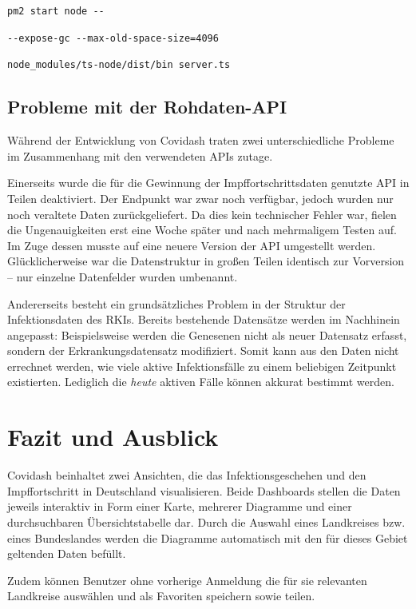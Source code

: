 \documentclass[conference]{IEEEtran}
\begin{document}
\texttt{pm2 start node -{}-}

\texttt{-{}-expose-gc -{}-max-old-space-size=4096}

\texttt{node\_modules/ts-node/dist/bin server.ts}



\subsection{Probleme mit der Rohdaten-API}

Während der Entwicklung von Covidash traten zwei unterschiedliche Probleme im Zusammenhang mit den verwendeten APIs zutage.

Einerseits wurde die für die Gewinnung der Impffortschrittsdaten genutzte API in Teilen deaktiviert. Der Endpunkt war zwar noch verfügbar, jedoch wurden nur noch veraltete Daten zurückgeliefert. Da dies kein technischer Fehler war, fielen die Ungenauigkeiten erst eine Woche später und nach mehrmaligem Testen auf. Im Zuge dessen musste auf eine neuere Version der API umgestellt werden. Glücklicherweise war die Datenstruktur in großen Teilen identisch zur Vorversion -- nur einzelne Datenfelder wurden umbenannt.

Andererseits besteht ein grundsätzliches Problem in der Struktur der Infektionsdaten des RKIs. Bereits bestehende Datensätze werden im Nachhinein angepasst: Beispielsweise werden die Genesenen nicht als neuer Datensatz erfasst, sondern der Erkrankungsdatensatz modifiziert. Somit kann aus den Daten nicht errechnet werden, wie viele aktive Infektionsfälle zu einem beliebigen Zeitpunkt existierten. Lediglich die \textit{heute} aktiven Fälle können akkurat bestimmt werden.






\section{Fazit und Ausblick}

Covidash beinhaltet zwei Ansichten, die das Infektionsgeschehen und den Impffortschritt in Deutschland visualisieren. Beide Dashboards stellen die Daten jeweils interaktiv in Form einer Karte, mehrerer Diagramme und einer durchsuchbaren Übersichtstabelle dar. Durch die Auswahl eines Landkreises bzw. eines Bundeslandes werden die Diagramme automatisch mit den für dieses Gebiet geltenden Daten befüllt.

Zudem können Benutzer ohne vorherige Anmeldung die für sie relevanten Landkreise auswählen und als Favoriten speichern sowie teilen.
\end{document}
